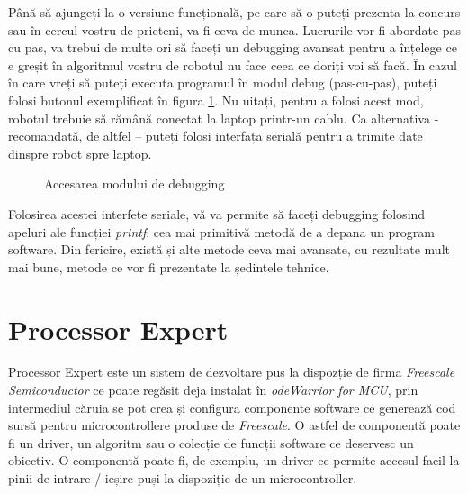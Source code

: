 Până să ajungeți la o versiune funcțională, pe care să o puteți prezenta la concurs sau în cercul vostru de prieteni, va fi ceva de munca. Lucrurile vor fi abordate pas cu pas, va trebui de multe ori să faceți un debugging avansat pentru a înțelege ce e greșit în algoritmul vostru de robotul nu face ceea ce doriți voi să facă. În cazul în care vreți să puteți executa programul în modul debug (pas-cu-pas), puteți folosi butonul exemplificat în figura \ref{fig:CodeWarrior-Debugging}. Nu uitați, pentru a folosi acest mod, robotul trebuie să rămână conectat la laptop printr-un cablu. Ca alternativa - recomandată, de altfel – puteți folosi interfața serială pentru a trimite date dinspre robot spre laptop.

\begin{figure}
    \vspace{-20pt}
    \vspace{-25pt}
    \caption{\label{fig:CodeWarrior-Debugging} Accesarea modului de debugging}
    \vspace{-20pt}
\end{figure}

Folosirea acestei interfețe seriale, vă va permite să faceți debugging folosind apeluri ale funcției \textit{printf}, cea mai primitivă metodă de a depana un program software. Din fericire, există și alte metode ceva mai avansate, cu rezultate mult mai bune, metode ce vor fi prezentate la ședințele tehnice.

\section{Processor Expert}

Processor Expert este un sistem de dezvoltare pus la dispozție de firma \textit{Freescale Semiconductor} ce poate regăsit deja instalat în \textit{odeWarrior for MCU}, prin intermediul căruia se pot crea și configura componente software ce generează cod sursă pentru microcontrollere produse de \textit{Freescale}. O astfel de componentă poate fi un driver, un algoritm sau o colecție de funcții software ce deservesc un obiectiv. O componentă poate fi, de exemplu, un driver ce permite accesul facil la pinii de intrare / ieșire puși la dispoziție de un microcontroller.

